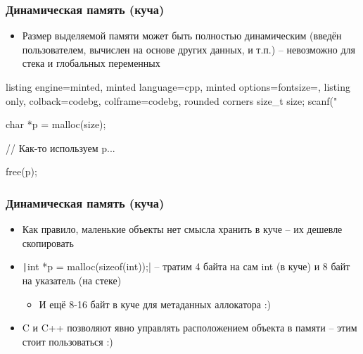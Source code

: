 \documentclass[10pt]{beamer}
\begin{document}
\begin{frame}[fragile]
\frametitle{Динамическая память (куча)}
\begin{itemize}
\item Размер выделяемой памяти может быть полностью динамическим (введён пользователем, вычислен на основе других данных, и т.п.) -- невозможно для стека и глобальных переменных
\end{itemize}
\begin{tcblisting}{listing engine=minted, minted language=cpp, minted options={fontsize=\scriptsize}, listing only, colback=codebg, colframe=codebg, rounded corners}
size_t size;
scanf("%

char *p = malloc(size);

// Как-то используем p...

free(p);
\end{tcblisting}
\end{frame}

\begin{frame}[fragile]
\frametitle{Динамическая память (куча)}
\begin{itemize}
\item Как правило, маленькие объекты нет смысла хранить в куче -- их дешевле скопировать
\pause
\item \texttt|int *p = malloc(sizeof(int));| -- тратим 4 байта на сам int (в куче) и 8 байт на указатель (на стеке)
\pause
\begin{itemize}
\item И ещё 8-16 байт в куче для метаданных аллокатора :)
\end{itemize}
\pause
\item C и C++ позволяют явно управлять расположением объекта в памяти -- этим стоит пользоваться :)
\end{itemize}
\end{frame}
\end{document}
